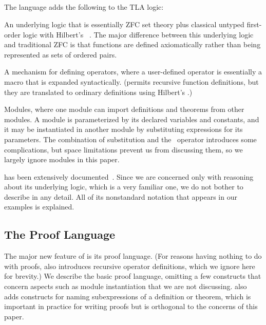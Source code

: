 \documentclass[a4paper]{easychair}
\begin{document}
\subsection{\tlaplus}

The \tlaplus language adds the following to the TLA logic:
\begin{icom}
\item An underlying logic that is essentially ZFC set theory plus
  classical untyped first-order logic with Hilbert's
  ~\cite{leisenring:mathematical-logic}.  The major
  difference between this underlying logic and traditional ZFC is that
  functions are defined axiomatically rather than being represented as
  sets of ordered pairs.

\item A mechanism for defining operators, where a user-defined
  operator is essentially a macro that is expanded syntactically.
  (\tlaplus permits recursive function definitions, but they are
  translated to ordinary definitions using Hilbert's .)

\item Modules, where one module can import definitions
  and theorems from other modules.  A module is parameterized by its
  declared variables and constants, and it may be instantiated in another
  module by substituting expressions for its parameters. The
  combination of substitution and the \ENABLED\ operator introduces
  some complications, but space limitations prevent us from discussing
  them, so we largely ignore modules in this paper.
\end{icom}
\tlaplus has been extensively documented~\cite{lamport03tla}.  Since
we are concerned only with reasoning about its underlying logic, which
is a very familiar one, we do not bother to describe \tlaplus in any
detail.  All of its nonstandard notation that appears in our examples is
explained.

\subsection{The Proof Language}
\label{sec:proof-language.lang}

The major new feature of \tlatwo is its proof language.  (For reasons
having nothing to do with proofs, \tlatwo also introduces recursive
operator definitions, which we ignore here for brevity.)  We describe
the basic proof language, omitting a few constructs
that concern aspects such as module instantiation that we are not
discussing.  \tlatwo also adds constructs for naming subexpressions
of a definition or theorem, which is important in practice for writing
proofs but is orthogonal to the concerns of this paper.
\end{document}
